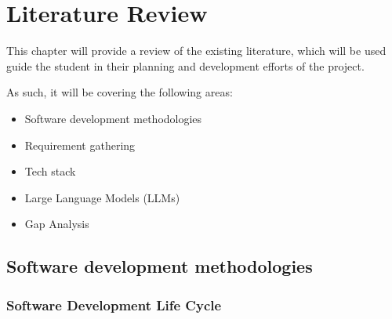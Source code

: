 \chapter{Literature Review}

This chapter will provide a review of the existing literature, which will be used guide the student in their planning and development efforts of the project.

\noindent As such, it will be covering the following areas:
\begin{itemize}
    \item Software development methodologies
    \item Requirement gathering
    \item Tech stack
    \item Large Language Models (LLMs)
    \item Gap Analysis
\end{itemize}

\section{Software development methodologies}

\subsection{Software Development Life Cycle}

